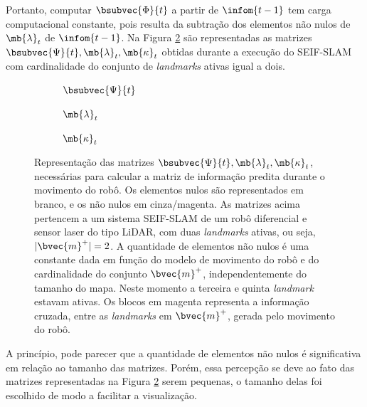 Portanto, computar $\bsubvec{\Phi}{t}$ a partir de $\infom{t-1}$
tem carga computacional constante, pois resulta da subtração dos elementos não nulos 
de $\mb{\lambda}_t$ de $\infom{t-1}$. Na Figura 
\ref{fig:seif-slam-prediction-variables} são representadas as matrizes $\bsubvec{\Psi}{t}, \mb{\lambda}_t, \mb{\kappa}_t$ obtidas durante a 
execução do SEIF-SLAM com cardinalidade do conjunto de \textit{landmarks} ativas 
igual a dois. 
\begin{figure}[h]
  \begin{subfigure}{.30\textwidth}
    
    \caption{$\bsubvec{\Psi}{t}$}
  \end{subfigure}
  \hfill
  \begin{subfigure}{.30\textwidth}
    
    \caption{$\mb{\lambda}_t$}
  \end{subfigure}
  \hfill
  \begin{subfigure}{.30\textwidth}
    
    \caption{$\mb{\kappa}_{t}$}
    \label{fig:seif-slam-kappa}
  \end{subfigure}
  \caption[Matrizes intermediárias utilizadas no passo de predição do Filtro de Informação Estendido Esparso]{Representação das matrizes $\bsubvec{\Psi}{t}, \mb{\lambda}_t, \mb{\kappa}_t$, necessárias para calcular a 
  matriz de informação predita durante o movimento do robô. Os elementos 
  nulos são representados em branco, e os não nulos em cinza/magenta. 
  As matrizes acima 
  pertencem a um sistema SEIF-SLAM de um robô diferencial e 
  sensor laser do tipo LiDAR, com duas \textit{landmarks} ativas, ou seja, $\lvert \bvec{m}^+ \rvert = 2$. A quantidade de elementos não nulos 
  é uma constante dada em função do modelo de movimento do robô e do cardinalidade do conjunto $\bvec{m}^+$, independentemente do tamanho do mapa. Neste momento a terceira e quinta \textit{landmark} estavam ativas. 
  Os blocos em magenta representa a informação cruzada, entre as \textit{landmarks} em $\bvec{m}^+$, gerada pelo movimento do robô.}
  \label{fig:seif-slam-prediction-variables}
\end{figure}

A princípio, pode parecer que a quantidade de elementos não 
nulos é significativa em relação ao tamanho das matrizes. Porém, essa 
percepção se deve ao fato das matrizes representadas na Figura \ref{fig:seif-slam-prediction-variables} serem pequenas, o tamanho delas foi escolhido de modo a facilitar a visualização.

